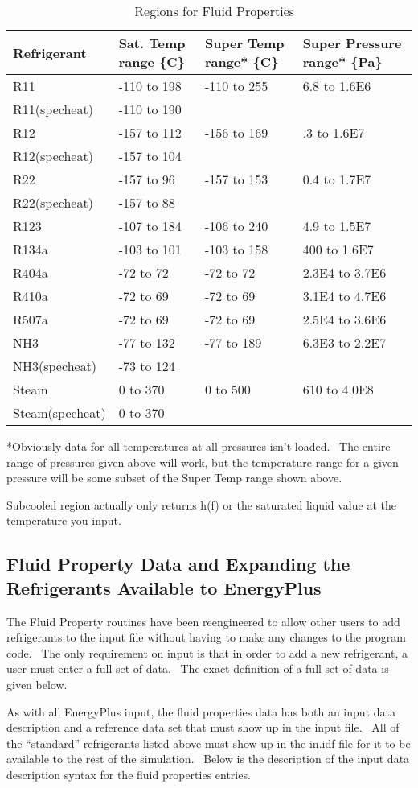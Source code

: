 \begin{longtable}[c]{p{1.5in}p{1.5in}p{1.5in}p{1.5in}}
\caption{  Regions for Fluid Properties \protect \label{table:regions-for-fluid-properties}}\\
\toprule 
Refrigerant & Sat. Temp range \{C\} & Super Temp range* \{C\} & Super Pressure range* \{Pa\} \tabularnewline \midrule
\endhead
R11 & -110 to 198 & -110 to 255 & 6.8 to 1.6E6 \tabularnewline
R11(specheat) & -110 to 190 & ~ & ~ \tabularnewline
R12 & -157 to 112 & -156 to 169 & .3 to 1.6E7 \tabularnewline
R12(specheat) & -157 to 104 & ~ & ~ \tabularnewline
R22 & -157 to 96 & -157 to 153 & 0.4 to 1.7E7 \tabularnewline
R22(specheat) & -157 to 88 & ~ & ~ \tabularnewline
R123 & -107 to 184 & -106 to 240 & 4.9 to 1.5E7 \tabularnewline
R134a & -103 to 101 & -103 to 158 & 400 to 1.6E7 \tabularnewline
R404a & -72 to 72 & -72 to 72 & 2.3E4 to 3.7E6 \tabularnewline
R410a & -72 to 69 & -72 to 69 & 3.1E4 to 4.7E6 \tabularnewline
R507a & -72 to 69 & -72 to 69 & 2.5E4 to 3.6E6 \tabularnewline
NH3 & -77 to 132 & -77 to 189 & 6.3E3 to 2.2E7 \tabularnewline
NH3(specheat) & -73 to 124 & ~ & ~ \tabularnewline
Steam & 0 to 370 & 0 to 500 & 610 to 4.0E8 \tabularnewline
Steam(specheat) & 0 to 370 & ~ & ~ \tabularnewline
\bottomrule
\end{longtable}

*Obviously data for all temperatures at all pressures isn't loaded.~ The entire range of pressures given above will work, but the temperature range for a given pressure will be some subset of the Super Temp range shown above.

Subcooled region actually only returns h(f) or the saturated liquid value at the temperature you input.

\subsection{Fluid Property Data and Expanding the Refrigerants Available to EnergyPlus}\label{fluid-property-data-and-expanding-the-refrigerants-available-to-energyplus}

The Fluid Property routines have been reengineered to allow other users to add refrigerants to the input file without having to make any changes to the program code.~ The only requirement on input is that in order to add a new refrigerant, a user must enter a full set of data.~ The exact definition of a full set of data is given below.

As with all EnergyPlus input, the fluid properties data has both an input data description and a reference data set that must show up in the input file.~ All of the ``standard'' refrigerants listed above must show up in the in.idf file for it to be available to the rest of the simulation.~ Below is the description of the input data description syntax for the fluid properties entries.

